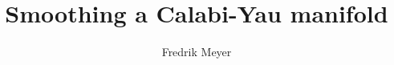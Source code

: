 \documentclass[]{uiophd}
\begin{document}
\title{Smoothing a Calabi-Yau manifold}
\author{Fredrik Meyer}
\maketitle 








\printbibliography

\listoftodos
\end{document}
